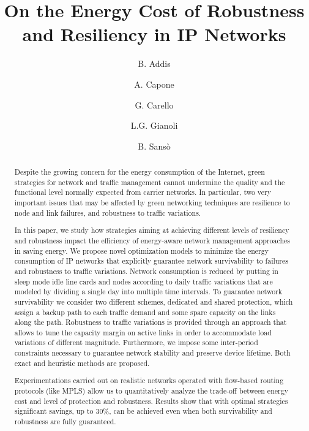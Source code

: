 \documentclass[final,5p,times,twocolumn]{elsarticle}
\begin{document}
\begin{frontmatter}

\title{On the Energy Cost of Robustness and Resiliency in IP Networks}
\author[turin]{B. Addis}
\author[milan]{A. Capone }
\author[milan]{G. Carello}
\author[milan,montreal]{L.G. Gianoli}
\author[montreal]{B. Sans\`o}
\address[milan]{Politecnico di Milano, Dipartimento di Elettronica, Informazione e Bioingegneria, Italy}
\address[turin]{LORIA, Universit\'e de Lorraine, CNRS, INRIA, Nancy, France}
\address[montreal]{\'Ecole Polytechnique de Montr\'eal, D\'epartement de G\'enie \'Electrique, Canada}
\date{}


\begin{abstract}
Despite the growing concern for the energy consumption of the Internet, green strategies for network and traffic management cannot undermine the quality and the functional level normally expected from carrier networks. In particular, two very important issues that may be affected by green networking techniques are resilience to node and link failures, and robustness to traffic variations.

In this paper, we study how strategies aiming at achieving different levels of resiliency and robustness impact the efficiency of energy-aware network management approaches in saving energy.  We propose novel optimization models to minimize the energy consumption of IP networks that explicitly guarantee network survivability to failures and robustness to traffic variations. Network consumption is reduced by putting in sleep mode idle line cards and nodes according to daily traffic variations that are modeled by dividing a single day into multiple time intervals. To guarantee network survivability we consider two different schemes, dedicated and shared protection, which assign a backup path  to each traffic demand and some spare capacity on the links along the path. Robustness to traffic variations is provided through an approach that allows to tune the capacity margin on active links in order to accommodate load variations of different magnitude. Furthermore, we impose some inter-period constraints necessary to guarantee network stability and preserve device lifetime. Both exact and heuristic methods are proposed. 

Experimentations carried out on realistic networks operated with flow-based routing protocols (like MPLS) allow us to quantitatively analyze the trade-off between energy cost and level of protection and robustness. Results show that with optimal strategies significant savings, up to 30\%, can be achieved even when both survivability and robustness are fully guaranteed.
\vspace{0.3cm}


\end{abstract}
\end{frontmatter}
\end{document}
